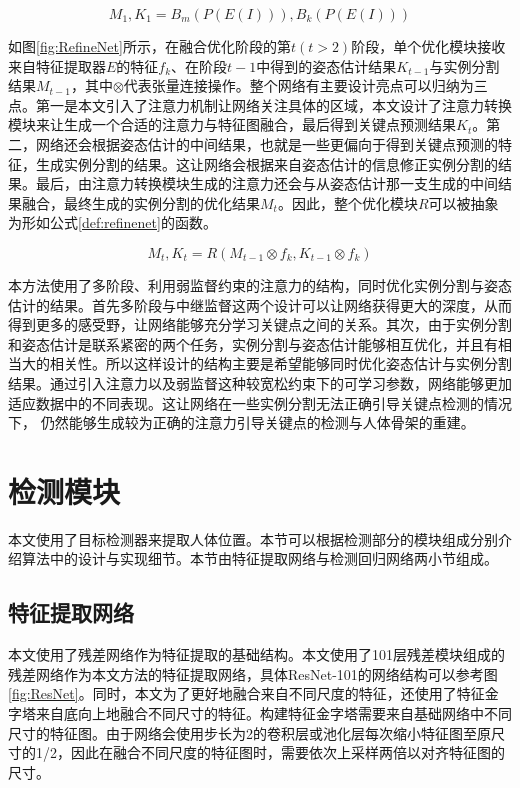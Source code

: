 \begin{equation}
\label{def:detectnet}
M_1, K_1 = B_m(P(E(I))), B_k(P(E(I)))
\end{equation}

如图\ref{fig:RefineNet}所示，在融合优化阶段的第$t(t>2)$阶段，单个优化模块接收来自特征提取器$E$的特征$f_k$、在阶段$t-1$中得到的姿态估计结果$K_{t-1}$与实例分割结果$M_{t-1}$，其中$\otimes$代表张量连接操作。整个网络有主要设计亮点可以归纳为三点。第一是本文引入了注意力机制让网络关注具体的区域，本文设计了注意力转换模块来让生成一个合适的注意力与特征图融合，最后得到关键点预测结果$K_t$。第二，网络还会根据姿态估计的中间结果，也就是一些更偏向于得到关键点预测的特征，生成实例分割的结果。这让网络会根据来自姿态估计的信息修正实例分割的结果。最后，由注意力转换模块生成的注意力还会与从姿态估计那一支生成的中间结果融合，最终生成的实例分割的优化结果$M_t$。因此，整个优化模块$R$可以被抽象为形如公式\eqref{def:refinenet}的函数。


\begin{equation}
\label{def:refinenet}
M_t, K_t = R(M_{t-1}\otimes f_k, K_{t-1}\otimes f_k)
\end{equation}

本方法使用了多阶段、利用弱监督约束的注意力的结构，同时优化实例分割与姿态估计的结果。首先多阶段与中继监督这两个设计可以让网络获得更大的深度，从而得到更多的感受野，让网络能够充分学习关键点之间的关系\cite{wei2016convolutional}。其次，由于实例分割和姿态估计是联系紧密的两个任务，实例分割与姿态估计能够相互优化，并且有相当大的相关性。所以这样设计的结构主要是希望能够同时优化姿态估计与实例分割结果。通过引入注意力以及弱监督这种较宽松约束下的可学习参数，网络能够更加适应数据中的不同表现。这让网络在一些实例分割无法正确引导关键点检测的情况下， 仍然能够生成较为正确的注意力引导关键点的检测与人体骨架的重建。

\section{检测模块}
\label{sec:detectionstage}
本文使用了目标检测器来提取人体位置。本节可以根据检测部分的模块组成分别介绍算法中的设计与实现细节。本节由特征提取网络与检测回归网络两小节组成。

\subsection{特征提取网络}
\label{subsec:featextract}
本文使用了残差网络作为特征提取的基础结构。本文使用了101层残差模块组成的残差网络作为本文方法的特征提取网络，具体ResNet-101的网络结构可以参考图\ref{fig:ResNet}。同时，本文为了更好地融合来自不同尺度的特征，还使用了特征金字塔\cite{Lin2016Feature}来自底向上地融合不同尺寸的特征。构建特征金字塔需要来自基础网络中不同尺寸的特征图。由于网络会使用步长为2的卷积层或池化层每次缩小特征图至原尺寸的1/2，因此在融合不同尺度的特征图时，需要依次上采样两倍以对齐特征图的尺寸。

